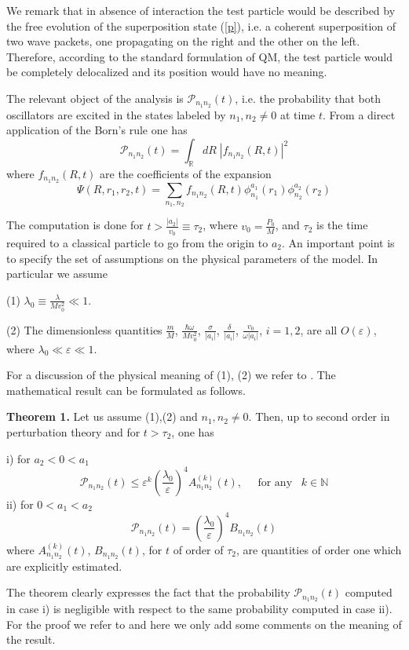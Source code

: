 \documentclass[12pt,reqno]{amsart}
\newcommand{\erre}{\mathbb{R}}
\newcommand{\natu}{\mathbb{N}}
\newcommand{\n}{\relax}
\newcommand{\vs}{\vspace{0.5cm}}
\newcommand{\f}{\frac}
\newcommand{\be}{\begin{equation}}
\newcommand{\ee}{\end{equation}}
\numberwithin{equation}{section}
\begin{document}
\n
We remark that in absence of  interaction  the test particle would be described by  the free evolution of the superposition state (\ref{p}), i.e. a coherent superposition of two wave packets, one propagating on the right and the other on the left.  Therefore, according to the standard formulation of QM,  the test particle  would be completely delocalized and its position would have no meaning. 

\n  
 The relevant object of the analysis is $\mathcal{P}_{n_1 n_2} (t)$, i.e. the probability that both oscillators are excited in the states labeled by $n_1, n_2 \neq 0$ at time $t$. From a direct application of the Born's rule one has 
\be
 \mathcal{P}_{\!n_1 n_2 \!}(t)= \int_{\erre} \!\! dR \;  |f_{n_1 n_2} (R,t) |^2
 \ee
where $f_{n_1 n_2} (R,t)$ are the coefficients of the expansion
\be
\Psi (R,r_1,r_2,t) = \sum_{n_1,n_2} f_{n_1 n_2}(R,t) \phi^{a_1}_{n_1}(r_1) \phi^{a_2}_{n_2}(r_2)
\ee

\n 
The computation is done for $t>\f{|a_2|}{v_0}\equiv \tau_2$,  where $v_0=\f{P_0}{M}$, and $\tau_2$ is the time required to a classical particle to go  from the origin to $a_2$. An important point is to specify the set of assumptions on the physical parameters of the model. In particular we assume

\n
(1) $\lambda_0 \equiv \f{\lambda}{Mv_0^2} \ll 1$.

\n
(2) The dimensionless quantities $\f{m}{M}$, $\f{\hbar \omega}{Mv_0^2}$, $\f{\sigma}{|a_i|}$, $\f{\delta}{|a_i|}$, $\f{v_0}{\omega |a_i|}$, $i=1,2$, are all $O(\varepsilon)$, where $\lambda_0 \ll \varepsilon \ll 1$.

\n
For a discussion of the physical meaning of (1),  (2) we refer to \cite{dft}. The mathematical result can be formulated as follows. 

\vs
\n
 {\bf Theorem 1.} 
Let us assume (1),(2) and $n_1, n_2 \neq 0$. Then, up to second order in perturbation theory and for $t>\tau_2$,  one has

\n
i) for $a_2 < 0<a_1$ 
\be
\mathcal{P}_{n_1 n_2}(t) \leq \varepsilon^k \left(\! \f{\lambda_0}{\varepsilon} \! \right)^4  A^{(k)}_{n_1 n_2} (t), \;\;\;\;\;\mbox{for any} \;\;\;k \in \natu
\ee
ii) for $0<a_1 <a_2$
\be
\mathcal{P}_{n_1 n_2}(t)= \left(\! \f{\lambda_0}{\varepsilon} \! \right)^4 B_{n_1 n_2}(t)
\ee
where $A^{(k)}_{n_1 n_2} (t)$, $B_{n_1 n_2}(t)$, for $t$ of order of $\tau_2$, are quantities of order one which are explicitly estimated. 

 \vs
 \n
The theorem clearly expresses the fact that  the probability $\mathcal{P}_{n_1 n_2}(t)$ computed in case i) is negligible with respect to the same probability computed in case ii). For the proof we refer to \cite{dft}  and here we only add some comments on the meaning of the result.
\end{document}
